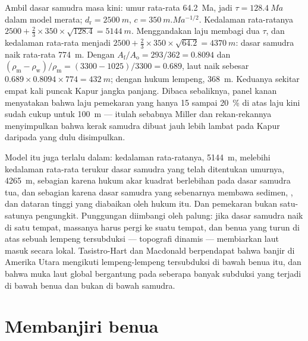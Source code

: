\begin{example}\label{ex:b2:phanerozoic-earth:doubling}
Ambil dasar samudra masa kini: umur rata-rata \qty{64.2}{Ma}, jadi $\tau = \qty{128.4}{Ma}$ dalam model merata;
$d_{\text{r}} = \qty{2500}{m}$, $c = \qty{350}{m.Ma^{-1/2}}$. Kedalaman rata-ratanya $2500 + \tfrac23
\times 350 \times \sqrt{128.4} = \qty{5144}{m}$. Menggandakan laju membagi dua $\tau$, dan kedalaman rata-rata
menjadi $2500 + \tfrac23 \times 350 \times \sqrt{64.2} = \qty{4370}{m}$: dasar samudra naik rata-rata
\qty{774}{m}. Dengan $A_{\text{f}}/A_{\text{o}} = 293/362 = 0.8094$ dan
$(\rho_{\text{m}} - \rho_{\text{w}})/\rho_{\text{m}} = (3300 - 1025)/3300 = 0.689$, laut naik
sebesar $0.689 \times 0.8094 \times 774 = \qty{432}{m}$; dengan hukum lempeng, \qty{368}{m}. Keduanya
sekitar empat kali puncak Kapur jangka panjang. Dibaca sebaliknya, panel kanan menyatakan bahwa
laju pemekaran yang hanya 15 sampai \qty{20}{\percent} di atas laju kini sudah cukup untuk \qty{100}{m} --- itulah
sebabnya Miller dan rekan-rekannya menyimpulkan bahwa kerak samudra dibuat jauh lebih lambat pada
Kapur daripada yang dulu disimpulkan.
\end{example}

Model itu juga terlalu dalam: kedalaman rata-ratanya, \qty{5144}{m}, melebihi kedalaman rata-rata terukur
dasar samudra yang telah ditentukan umurnya, \qty{4265}{m}, sebagian karena hukum akar kuadrat berlebihan pada dasar samudra tua, dan
sebagian karena dasar samudra yang sebenarnya membawa sedimen, , dan dataran tinggi yang diabaikan oleh hukum itu. Dan pemekaran bukan
satu-satunya pengungkit. Punggungan diimbangi oleh palung: jika dasar samudra naik di satu tempat, massanya harus
pergi ke suatu tempat, dan benua yang turun di atas sebuah lempeng tersubduksi --- topografi dinamis --- membiarkan laut masuk
secara lokal. Tasistro-Hart dan Macdonald berpendapat bahwa banjir di Amerika Utara mengikuti lempeng-lempeng tersubduksi
di bawah benua itu, dan bahwa muka laut global bergantung pada seberapa banyak subduksi yang terjadi di bawah
benua dan bukan di bawah samudra.

\section{Membanjiri benua}\label{sec:b2:phanerozoic-earth:flooding}

